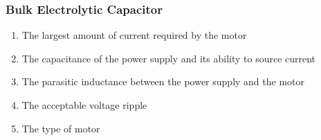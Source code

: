 
\subsubsection{Bulk Electrolytic Capacitor}

\begin {enumerate}
	\item The largest amount of current required by the motor
	\item The capacitance of the power supply and its ability to source current
	\item The parasitic inductance between the power supply and the motor
	\item The acceptable voltage ripple
	\item The type of motor
\end {enumerate}



